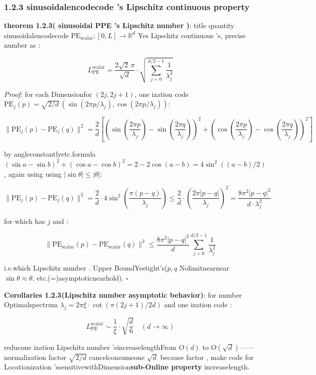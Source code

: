 \documentclass[
  12pt,
]{article}
\begin{document}
\subsubsection{1.2.3  sinusoidalencodecode 's Lipschitz
continuous property }\label{ux6b63ux5f26ux7f16ux7801ux7684-lipschitz-ux8fdeux7eedux6027}

\textbf{theorem  1.2.3( sinusoidal PPE 's Lipschitz number )}: title quantity  sinusoidalencodecode 
\(\text{PE}_{\text{scalar}}: [0, L] \to \mathbb{R}^d\) Yes Lipschitz
continuous 's, precise number as : 

\[\boxed{L_{\text{PE}}^{\text{scalar}} = \frac{2\sqrt{2}\,\pi}{\sqrt{d}} \cdot \sqrt{\sum_{j=0}^{d/2-1} \frac{1}{\lambda_j^2}}}\]

\emph{Proof}: for each Dimensionfor  \((2j, 2j+1)\), one ization code 
\(\text{PE}_j(p) = \sqrt{2/d}\,(\sin(2\pi p/\lambda_j), \cos(2\pi p/\lambda_j))\): 

\[\|\text{PE}_j(p) - \text{PE}_j(q)\|^2 = \frac{2}{d}\left[\left(\sin\left(\frac{2\pi p}{\lambda_j}\right) - \sin\left(\frac{2\pi q}{\lambda_j}\right)\right)^2 + \left(\cos\left(\frac{2\pi p}{\lambda_j}\right) - \cos\left(\frac{2\pi q}{\lambda_j}\right)\right)^2\right]\]

by angleconstantlyetc.formula 
\((\sin a - \sin b)^2 + (\cos a - \cos b)^2 = 2 - 2\cos(a-b) = 4\sin^2((a-b)/2)\), again using using 
\(|\sin\theta| \leq |\theta|\): 

\[\|\text{PE}_j(p) - \text{PE}_j(q)\|^2 = \frac{2}{d} \cdot 4\sin^2\!\left(\frac{\pi(p-q)}{\lambda_j}\right) \leq \frac{2}{d} \cdot \left(\frac{2\pi|p-q|}{\lambda_j}\right)^2 = \frac{8\pi^2|p-q|^2}{d \cdot \lambda_j^2}\]

for which has  \(j\) and : 

\[\|\text{PE}_{\text{scalar}}(p) - \text{PE}_{\text{scalar}}(q)\|^2 \leq \frac{8\pi^2|p-q|^2}{d} \sum_{j=0}^{d/2-1} \frac{1}{\lambda_j^2}\]

i.e.which  Lipschitz number . Upper BoundYestight's(\(p, q\) Nolimitnearnear
\(\sin\theta \approx \theta\), etc.(=)asymptoticnearhold). \(\square\)

\textbf{Corollaries 1.2.3(Lipschitz number asymptotic behavior)}: for number Optimalspectrum
\(\lambda_j = 2\pi\xi \cdot \cot(\pi(2j+1)/2d)\) and one ization code : 

\[L_{\text{PE}}^{\text{scalar}} \sim \frac{1}{\xi} \cdot \sqrt{\frac{d}{6}} \quad (d \to \infty)\]

reducone ization  Lipschitz number 'sincreaselengthFrom \(O(d)\) to
\(O(\sqrt{d})\)------normalization factor  \(\sqrt{2/d}\) cancelconsumeone  \(\sqrt{d}\)
because factor , make code for Locationization 'ssensitivewithDimension\textbf{sub-Online property }increaselength. 
\end{document}
